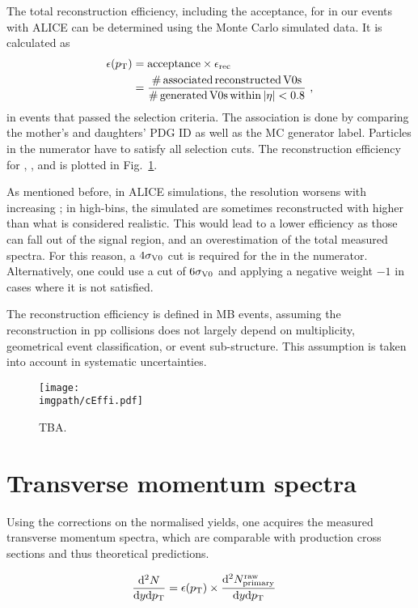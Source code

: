 The total reconstruction efficiency, including the acceptance, for \VOs in our events with ALICE can be determined using the Monte Carlo simulated data. It is calculated as
\begin{align}
\epsilon ( p_{\text{T}} ) &= \mathrm{acceptance} \times \epsilon_\mathrm{rec}  \\
&=  \frac{\mathrm{\# \, associated \, reconstructed \, \rm V 0 s  }}{\mathrm{\# \, generated \, \rm V 0 s \, within \, |\eta|<0.8}}\, \, ,
\end{align}
in events that passed the selection criteria. The association is done by comparing the mother's and daughters' PDG ID as well as the MC generator label. Particles in the numerator have to satisfy all selection cuts. The reconstruction efficiency for \KOs, \LA, and \AL is plotted in Fig.~\ref{fig:analysis:effi}.

As mentioned before, in ALICE simulations, the \Minv resolution worsens with increasing \pt; in high-\pt bins, the simulated \VOs are sometimes reconstructed with higher \Minv than what is considered realistic. This would lead to a lower efficiency as those \VOs can fall out of the signal region, and an overestimation of the total measured spectra. For this reason, a $4\sigma_{\rm V 0}$ cut is required for the \VOs \Minv in the numerator. Alternatively, one could use a cut of $6 \sigma_{\rm V 0}$  and applying a negative weight $-1$ in cases where it is not satisfied. 

The reconstruction efficiency is defined in MB events, assuming the reconstruction in pp collisions does not largely depend on multiplicity, geometrical event classification, or event sub-structure. This assumption is taken into account in systematic uncertainties.

\begin{figure}%
\texttt{[image: \\imgpath/cEffi.pdf]}%
\caption{TBA.}%
\label{fig:analysis:effi}%
\end{figure}

\section{Transverse momentum spectra}

Using the corrections on the normalised yields, one acquires the measured transverse momentum spectra, which are comparable with production cross sections and thus theoretical predictions.

\begin{align}
\frac{\mathrm{d}^2 N}{\mathrm{d}y \mathrm{d}p_{\text{T}}} &= \epsilon (p_{\text{T}}) \times \frac{\mathrm{d}^2 N^\mathrm{raw}_\mathrm{primary}}{\mathrm{d}y \mathrm{d}p_{\text{T}}}
\end{align}

